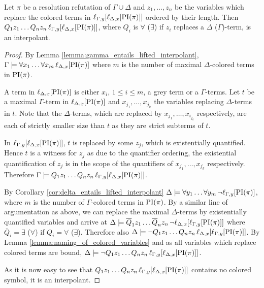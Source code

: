 \begin{thm}
	Let $\pi$ be a resolution refutation of $\Gamma \cup \Delta$ and
	$z_1, \dots, z_n$ be the variables which replace the colored terms in $\lifgamma{\lifdelta{\PI(\pi)}}$ ordered by their length.
	Then
	$Q_1 z_1 \ldots Q_n z_n\,\lifgamma{\lifdelta{\PI(\pi)}}$, where $Q_i$ is $\forall$ ($\exists$) if $z_i$ replaces a $\Delta$ ($\Gamma$)-term, is an interpolant.
\end{thm}
\begin{proof}
	By Lemma \ref{lemma:gamma_entails_lifted_interpolant}, $\Gamma \entails \forall x_1 \ldots \forall x_m\,\lifdelta{\PI(\pi)}$ where $m$ is the number of maximal $\Delta$-colored terms in $\PI(\pi)$.

	A term in $\lifdelta{\PI(\pi)}$ is either $x_i$, $1 \leq i \leq m$, a grey term or a $\Gamma$-terms.
	Let $t$ be a maximal $\Gamma$-term in $\lifdelta{\PI(\pi)}$ and $x_{j_1}, \dots, x_{j_k}$ the variables replacing $\Delta$-terms in $t$.
	Note that the $\Delta$-terms, which are replaced by $x_{j_1}, \ldots, x_{i_{j_k}}$ respectively, are each of strictly smaller size than $t$ as they are strict subterms of $t$.


	In $\lifgamma{\lifdelta{\PI(\pi)}}$, $t$ is replaced by some $z_j$, which is existentially quantified.
	Hence $t$ is a witness for $z_j$ as due to the quantifier ordering,
	the existential quantification of $z_j$ is in the scope of the quantifiers of $x_{j_1}, \ldots, x_{j_k}$ respectively.
	Therefore $\Gamma \entails Q_1 z_1 \ldots Q_n z_n\,\lifgamma{\lifdelta{\PI(\pi)}}$.

	By Corollary \ref{cor:delta_entails_lifted_interpolant} $\Delta \entails \forall y_1 \dots \forall y_m\,\lnot \lift{\Gamma}{\PI(\pi)}{y}$, where $m$ is the number of $\Gamma$-colored terms in $\PI(\pi)$.
	By a similar line of argumentation as above, we can replace the maximal $\Delta$-terms by existentially quantified variables and arrive at
	$\Delta \entails\nolinebreak{} \overline Q_1 z_1 \dots \overline Q_n z_n\,\lnot \lft{\Delta}{x}{\lft{\Gamma}{y}{\PI(\pi)}}$ where $\overline Q_i = \exists$ ($\forall$) if $Q_i = \forall$ ($\exists$).
	Therefore also
	$\Delta \entails\nolinebreak{} \lnot Q_1 z_1 \dots Q_n z_n\,\lft{\Delta}{x}{\lft{\Gamma}{y}{\PI(\pi)}}$.
	By Lemma \ref{lemma:naming_of_colored_variables} and as all variables which replace colored terms are bound, 
	$\Delta \entails\nolinebreak{} \lnot Q_1 z_1 \dots Q_n z_n\,\lft{\Gamma}{y}{\lft{\Delta}{x}{\PI(\pi)}}$.

	As it is now easy to see that $Q_1 z_1 \dots Q_n z_n\,\lft{\Gamma}{y}{\lft{\Delta}{x}{\PI(\pi)}}$ contains no colored symbol, it is an interpolant.
\end{proof}



